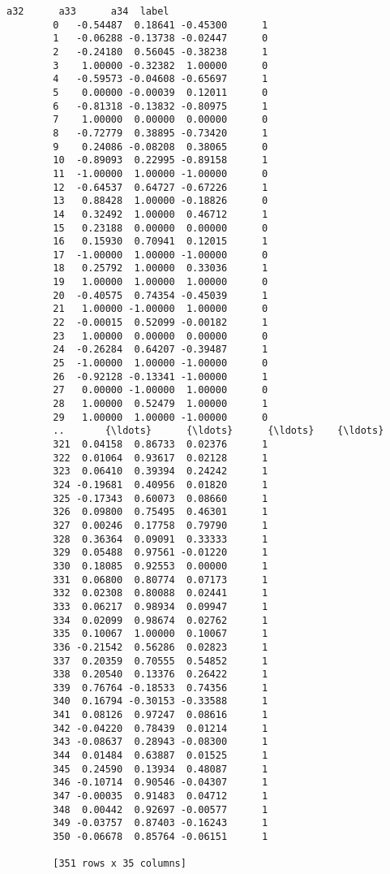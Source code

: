 \documentclass[11pt]{article}
\begin{document}
\begin{Verbatim}[commandchars=\\\{\}]
                 a32      a33      a34  label  
        0   -0.54487  0.18641 -0.45300      1  
        1   -0.06288 -0.13738 -0.02447      0  
        2   -0.24180  0.56045 -0.38238      1  
        3    1.00000 -0.32382  1.00000      0  
        4   -0.59573 -0.04608 -0.65697      1  
        5    0.00000 -0.00039  0.12011      0  
        6   -0.81318 -0.13832 -0.80975      1  
        7    1.00000  0.00000  0.00000      0  
        8   -0.72779  0.38895 -0.73420      1  
        9    0.24086 -0.08208  0.38065      0  
        10  -0.89093  0.22995 -0.89158      1  
        11  -1.00000  1.00000 -1.00000      0  
        12  -0.64537  0.64727 -0.67226      1  
        13   0.88428  1.00000 -0.18826      0  
        14   0.32492  1.00000  0.46712      1  
        15   0.23188  0.00000  0.00000      0  
        16   0.15930  0.70941  0.12015      1  
        17  -1.00000  1.00000 -1.00000      0  
        18   0.25792  1.00000  0.33036      1  
        19   1.00000  1.00000  1.00000      0  
        20  -0.40575  0.74354 -0.45039      1  
        21   1.00000 -1.00000  1.00000      0  
        22  -0.00015  0.52099 -0.00182      1  
        23   1.00000  0.00000  0.00000      0  
        24  -0.26284  0.64207 -0.39487      1  
        25  -1.00000  1.00000 -1.00000      0  
        26  -0.92128 -0.13341 -1.00000      1  
        27   0.00000 -1.00000  1.00000      0  
        28   1.00000  0.52479  1.00000      1  
        29   1.00000  1.00000 -1.00000      0  
        ..       {\ldots}      {\ldots}      {\ldots}    {\ldots}  
        321  0.04158  0.86733  0.02376      1  
        322  0.01064  0.93617  0.02128      1  
        323  0.06410  0.39394  0.24242      1  
        324 -0.19681  0.40956  0.01820      1  
        325 -0.17343  0.60073  0.08660      1  
        326  0.09800  0.75495  0.46301      1  
        327  0.00246  0.17758  0.79790      1  
        328  0.36364  0.09091  0.33333      1  
        329  0.05488  0.97561 -0.01220      1  
        330  0.18085  0.92553  0.00000      1  
        331  0.06800  0.80774  0.07173      1  
        332  0.02308  0.80088  0.02441      1  
        333  0.06217  0.98934  0.09947      1  
        334  0.02099  0.98674  0.02762      1  
        335  0.10067  1.00000  0.10067      1  
        336 -0.21542  0.56286  0.02823      1  
        337  0.20359  0.70555  0.54852      1  
        338  0.20540  0.13376  0.26422      1  
        339  0.76764 -0.18533  0.74356      1  
        340  0.16794 -0.30153 -0.33588      1  
        341  0.08126  0.97247  0.08616      1  
        342 -0.04220  0.78439  0.01214      1  
        343 -0.08637  0.28943 -0.08300      1  
        344  0.01484  0.63887  0.01525      1  
        345  0.24590  0.13934  0.48087      1  
        346 -0.10714  0.90546 -0.04307      1  
        347 -0.00035  0.91483  0.04712      1  
        348  0.00442  0.92697 -0.00577      1  
        349 -0.03757  0.87403 -0.16243      1  
        350 -0.06678  0.85764 -0.06151      1  
        
        [351 rows x 35 columns]
\end{Verbatim}
            
\end{document}
